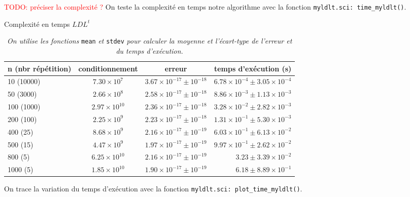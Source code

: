 \documentclass{article}
\begin{document}
\textcolor{red}{TODO: préciser la complexité ?}\newline\indent
On teste la complexité en temps notre algorithme avec la fonction \texttt{myldlt.sci: time\_myldlt()}.
\begin{table}[H]
\centering
\footnotesize
\renewcommand*\arraystretch{1.3}
\caption{Complexité en temps \(LDL^t\)}
\begin{tabular}{|l|c|c|r|}
  \hline
  n (nbr répétition) & conditionnement & erreur & temps d'exécution (s)\\
  \hline
	10 (10000)	& \(7.30 \times 10^{7}  \)	& \(3.67 \times 10^{-17} \pm 10^{-18}	\)	& \(6.78 \times 10^{-4} \pm3.05 \times 10^{-4}\) \\
	50 (3000)	& \(2.66 \times 10^{8}  \)	& \(2.58 \times 10^{-17} \pm 10^{-18}	\)	& \(8.86 \times 10^{-3} \pm1.13 \times 10^{-3}\) \\
	100 (1000)	& \(2.97 \times 10^{10} \)& \(2.36 \times 10^{-17} \pm 10^{-18}	\)	& \(3.28 \times 10^{-2} \pm2.82 \times 10^{-3}\) \\
	200 (100)	& \(2.25 \times 10^{9}  \)	& \(2.23 \times 10^{-17} \pm 10^{-18}	\)	& \(1.31 \times 10^{-1} \pm5.30 \times 10^{-3}\) \\
	400 (25)	& \(8.68 \times 10^{9}  \)	& \(2.16 \times 10^{-17} \pm 10^{-19}	\)	& \(6.03 \times 10^{-1} \pm6.13 \times 10^{-2}\) \\
	500 (15)	& \(4.47 \times 10^{9}  \)	& \(1.97 \times 10^{-17} \pm 10^{-19}	\)	& \(9.97 \times 10^{-1} \pm2.62 \times 10^{-2}\) \\
	800 (5)		& \(6.25 \times 10^{10} \)	& \(2.16 \times 10^{-17} \pm 10^{-19}	\)	& \(3.23 \pm3.39 \times 10^{-2}\) \\
	1000 (5)	& \(1.85 \times 10^{10} \)	& \(1.90 \times 10^{-17} \pm 10^{-19}	\)	& \(6.18 \pm8.89 \times 10^{-1}\) \\
  \hline
\end{tabular}
\caption*{\textit{On utilise les fonctions }\texttt{mean}\textit{ et }\texttt{stdev} \textit{pour calculer la moyenne et l'écart-type de l'erreur et du temps d'exécution.}}
\end{table}

On trace la variation du temps d'exécution avec la fonction \texttt{myldlt.sci: plot\_time\_myldlt()}.
\end{document}
